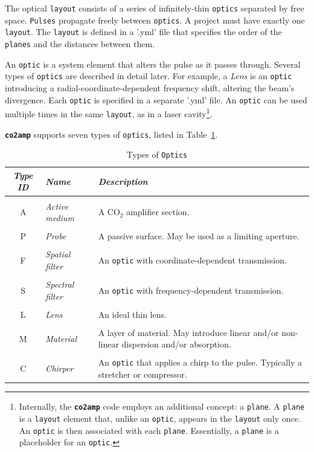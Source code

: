 \documentclass{report}
\begin{document}
The optical \texttt{layout} consists of a series of infinitely-thin \texttt{optics} separated by free space. \texttt{Pulses} propagate freely between \texttt{optics}. A project must have exactly one \texttt{layout}. The \texttt{layout} is defined in a '.yml' file that specifies the order of the \texttt{planes} and the distances between them.

An \texttt{optic} is a system element that alters the pulse as it passes through. Several types of \texttt{optics} are described in detail later. For example, a \textit{Lens} is an \texttt{optic} introducing a radial-coordinate-dependent frequency shift, altering the beam's divergence. Each \texttt{optic} is specified in a separate '.yml' file. An \texttt{optic} can be used multiple times in the same \texttt{layout}, as in a laser cavity\footnote{Internally, the \textbf{\texttt{co2amp}} code employs an additional concept: a \texttt{plane}. A \texttt{plane} is a \texttt{layout} element that, unlike an \texttt{optic}, appears in the \texttt{layout} only once. An \texttt{optic} is then associated with each \texttt{plane}. Essentially, a \texttt{plane} is a placeholder for an \texttt{optic}.}.

\textbf{\texttt{co2amp}} supports seven types of \texttt{optics}, listed in Table~\ref{table:optics}.

\begin{table}
\caption{Types of \texttt{Optics}}
\label{table:optics}
\begin{tabularx}{\textwidth}{c l X}
\hline 
\textit{\textbf{Type ID}} & \textit{\textbf{Name}} & \textit{\textbf{Description}}\\
\hline 
&&\\
A & \textit{Active medium} & A CO$_2$ amplifier section.\\
&&\\
P & \textit{Probe} & A passive surface. May be used as a limiting aperture.\\
&&\\
F & \textit{Spatial filter} & An \texttt{optic} with coordinate-dependent transmission.\\
&&\\
S & \textit{Spectral filter} & An \texttt{optic} with frequency-dependent transmission.\\
&&\\
L & \textit{Lens} & An ideal thin lens.\\
&&\\
M & \textit{Material} & A layer of material. May introduce linear and/or non-linear dispersion and/or absorption.\\
&&\\
C & \textit{Chirper} & An \texttt{optic} that applies a chirp to the pulse. Typically a stretcher or compressor.\\
\hline
\end{tabularx}
\end{table}
\end{document}
